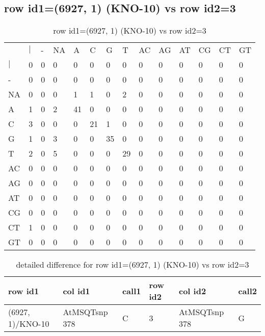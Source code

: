 \subsection{row id1=(6927, 1) (KNO-10) vs row id2=3}
\begin{center}
\begin{longtable}{|l|l|l|l|l|l|l|l|l|l|l|l|l|l|}
\caption{row id1=(6927, 1) (KNO-10) vs row id2=3} \label{table_dm120}\\
\hline
\\
\hline
&$|$&-&NA&A&C&G&T&AC&AG&AT&CG&CT&GT\\
$|$&0&0&0&0&0&0&0&0&0&0&0&0&0\\
-&0&0&0&0&0&0&0&0&0&0&0&0&0\\
NA&0&0&0&1&1&0&2&0&0&0&0&0&0\\
A&1&0&2&41&0&0&0&0&0&0&0&0&0\\
C&3&0&0&0&21&1&0&0&0&0&0&0&0\\
G&1&0&3&0&0&35&0&0&0&0&0&0&0\\
T&2&0&5&0&0&0&29&0&0&0&0&0&0\\
AC&0&0&0&0&0&0&0&0&0&0&0&0&0\\
AG&0&0&0&0&0&0&0&0&0&0&0&0&0\\
AT&0&0&0&0&0&0&0&0&0&0&0&0&0\\
CG&0&0&0&0&0&0&0&0&0&0&0&0&0\\
CT&1&0&0&0&0&0&0&0&0&0&0&0&0\\
GT&0&0&0&0&0&0&0&0&0&0&0&0&0\\
\hline
\end{longtable}
\end{center}

\begin{center}
\begin{longtable}{|l|l|l|l|l|l|}
\caption{detailed difference for row id1=(6927, 1) (KNO-10) vs row id2=3} \label{table_dm121}\\
\hline
row id1&col id1&call1&row id2&col id2&call2\\
\hline
(6927, 1)/KNO-10&AtMSQTsnp 378&C&3&AtMSQTsnp 378&G\\
\hline
\end{longtable}
\end{center}

